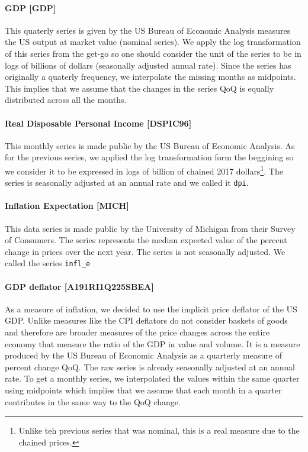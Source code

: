 \documentclass[hidelinks,12pts]{article}
\DeclareMathOperator{\1}{\mathbbm{1}}
\begin{document}
\paragraph{GDP [GDP]} %
This quaterly series is given by the US Bureau of Economic Analysis measures the US output at market value (nominal series). 
We apply the log transformation of this series from the get-go so one should consider the unit of the series to be in logs of billions of dollars (seasonally adjusted annual rate). 
Since the series has originally a quaterly frequency, we interpolate the missing months as midpoints. 
This implies that we assume that the changes in the series QoQ is equally distributed across all the months. 


\paragraph{Real Disposable Personal Income [DSPIC96]} %
This monthly series is made public by the US Bureau of Economic Analysis. As for the previous series, we applied the log transformation form the beggining so we consider it to be expressed in logs of billion of chained 2017 dollars\footnote{Unlike teh previous series that was nominal, this is a real measure due to the chained prices.}.
The series is seasonally adjusted at an annual rate and we called it \texttt{dpi}.



\paragraph{Inflation Expectation [MICH]}
This data series is made public by the University of Michigan from their Survey of Consumers. 
The series represents the median expected value of the percent change in prices over the next year. 
The series is not seasonally adjusted. We called the series \texttt{infl\_e}


\paragraph{GDP deflator [A191RI1Q225SBEA]}  
As a measure of inflation, we decided to use the implicit price deflator of the US GDP. 
Unlike measures like the CPI deflators do not consider baskets of goods and therefore are broader measures of the price changes across the entire economy that measure the ratio of the GDP in value and volume. 
It is a measure produced by the US Bureau of Economic Analysis as a quarterly measure of percent change QoQ. 
The raw series is already seasonally adjusted at an annual rate. 
To get a monthly series, we interpolated the values within the same quarter using midpoints which implies that we assume that each month in a quarter contributes in the same way to the QoQ change. 
\end{document}
